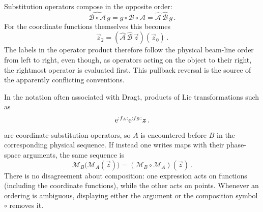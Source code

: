 Substitution operators compose in the opposite order:
\begin{equation}\label{eq:pullback-order}
    \widehat{\mathcal{B}\circ\mathcal{A}}\,g
    = g\circ\mathcal{B}\circ\mathcal{A}
    = \widehat{\mathcal{A}}\,\widehat{\mathcal{B}}\,g\,.
\end{equation}
For the coordinate functions themselves this becomes
\begin{equation}
    \vec z_2 = \left(\widehat{\mathcal{A}}\,
    \widehat{\mathcal{B}}\,\vec z\right)(\vec z_0)\,.
\end{equation}
The labels in the operator product therefore follow the physical beam-line
order from left to right, even though, as operators acting on the object to
their right, the rightmost operator is evaluated first.  This pullback
reversal is the source of the apparently conflicting conventions.

In the notation often associated with Dragt, products of Lie
transformations such as
\begin{equation}
    \mathrm{e}^{{:{f_A}:}}\mathrm{e}^{{:{f_B}:}}\bm{z}\,.
\end{equation}
are coordinate-substitution operators, so $A$ is encountered before $B$ in
the corresponding physical sequence.  If instead one writes maps with
their phase-space arguments, the same sequence is
\begin{equation}
    \mathcal{M}_B\bigl(\mathcal{M}_A(\vec z)\bigr)
    = \left(\mathcal{M}_B\circ\mathcal{M}_A\right)(\vec z)\,.
\end{equation}
There is no disagreement about composition: one expression acts on
functions (including the coordinate functions), while the other acts on
points.  Whenever an ordering is ambiguous, displaying either the argument
or the composition symbol $\circ$ removes it.
